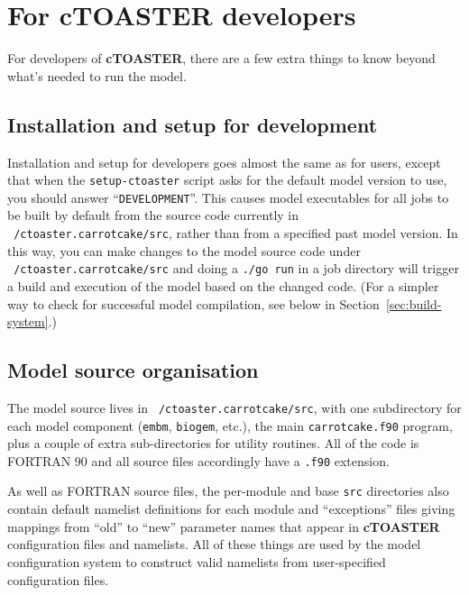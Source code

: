 \documentclass[a4paper,10pt,article]{memoir}
\begin{document}
\chapter{For cTOASTER developers}
\label{sec:genie-devs}

For developers of \textbf{cTOASTER}, there are a few extra things to know beyond
what's needed to run the model.

\section{Installation and setup for development}

Installation and setup for developers goes almost the same as for
users, except that when the \texttt{setup-ctoaster} script asks for the
default model version to use, you should answer
``\texttt{DEVELOPMENT}''.  This causes model executables for all jobs
to be built by default from the source code currently in
\texttt{~/ctoaster.carrotcake/src}, rather than from a specified past model
version.  In this way, you can make changes to the model source code
under \texttt{~/ctoaster.carrotcake/src} and doing a \texttt{./go run} in a job
directory will trigger a build and execution of the model based on the
changed code.  (For a simpler way to check for successful model
compilation, see below in Section~\ref{sec:build-system}.)

\section{Model source organisation}

The model source lives in \texttt{~/ctoaster.carrotcake/src}, with one subdirectory
for each model component (\texttt{embm}, \texttt{biogem}, etc.), the
main \texttt{carrotcake.f90} program, plus a couple of extra sub-directories
for utility routines.  All of the code is FORTRAN 90 and all source
files accordingly have a \texttt{.f90} extension.

As well as FORTRAN source files, the per-module and base \texttt{src}
directories also contain default namelist definitions for each module
and ``exceptions'' files giving mappings from ``old'' to ``new''
parameter names that appear in \textbf{cTOASTER} configuration files and
namelists.  All of these things are used by the model configuration
system to construct valid namelists from user-specified configuration
files.
\end{document}
